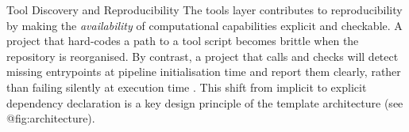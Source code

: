 \documentclass[
  ignorenonframetext,
]{beamer}
\begin{document}
\begin{frame}{Tool Discovery and
Reproducibility}
\protect{}\label{tool-discovery-and-reproducibility}
The tools layer contributes to reproducibility by making the
\emph{availability} of computational capabilities explicit and
checkable. A project that hard-codes a path to a tool script becomes
brittle when the repository is reorganised. By contrast, a project that
calls  and checks
 will detect missing
entrypoints at pipeline initialisation time and report them clearly,
rather than failing silently at execution time
. This shift from implicit to explicit
dependency declaration is a key design principle of the template
architecture (see @fig:architecture).
\end{frame}
\end{document}
